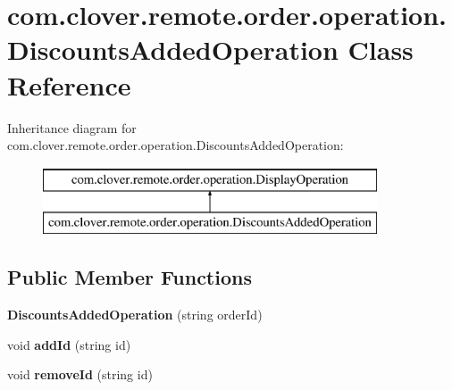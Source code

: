 \hypertarget{classcom_1_1clover_1_1remote_1_1order_1_1operation_1_1_discounts_added_operation}{}\section{com.\+clover.\+remote.\+order.\+operation.\+Discounts\+Added\+Operation Class Reference}
\label{classcom_1_1clover_1_1remote_1_1order_1_1operation_1_1_discounts_added_operation}
Inheritance diagram for com.\+clover.\+remote.\+order.\+operation.\+Discounts\+Added\+Operation\+:\begin{figure}[H]
\begin{center}
\leavevmode
\includegraphics[height=2.000000cm]{classcom_1_1clover_1_1remote_1_1order_1_1operation_1_1_discounts_added_operation}
\end{center}
\end{figure}
\subsection*{Public Member Functions}
\begin{DoxyCompactItemize}
\item 
\mbox{\label{classcom_1_1clover_1_1remote_1_1order_1_1operation_1_1_discounts_added_operation_aeea6c594585c1d48382b4b51ee40eac2}} 
{\bfseries Discounts\+Added\+Operation} (string order\+Id)
\item 
\mbox{\label{classcom_1_1clover_1_1remote_1_1order_1_1operation_1_1_discounts_added_operation_acbfeb2a5687ddb9184b13a64cefbc90c}} 
void {\bfseries add\+Id} (string id)
\item 
\mbox{\label{classcom_1_1clover_1_1remote_1_1order_1_1operation_1_1_discounts_added_operation_aa1ed76c21fcd8addc3778371e4247f35}} 
void {\bfseries remove\+Id} (string id)
\end{DoxyCompactItemize}
